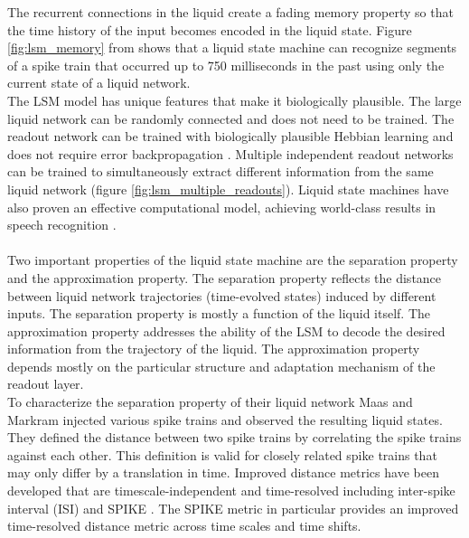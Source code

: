 \documentclass[a4paper,11pt]{article}
\begin{document}
The recurrent connections in the liquid create a fading memory property so that the time history of the input becomes encoded in the liquid state.
Figure \ref{fig:lsm_memory} from \cite{maas2002} shows that a liquid state machine can recognize segments of a spike train that occurred up to 750 milliseconds in the past using only the current state of a liquid network.
\\
The LSM model has unique features that make it biologically plausible. 
The large liquid network can be randomly connected and does not need to be trained.
The readout network can be trained with biologically plausible Hebbian learning and does not require error backpropagation \cite{auer2002}.
Multiple independent readout networks can be trained to simultaneously extract different information from the same liquid network (figure \ref{fig:lsm_multiple_readouts}).
Liquid state machines have also proven an effective computational model, achieving world-class results in speech recognition \cite{zhang2015}.
\\ \\
Two important properties of the liquid state machine are the separation property and the approximation property.
The separation property reflects the distance between liquid network trajectories (time-evolved states) induced by different inputs.
The separation property is mostly a function of the liquid itself.
The approximation property addresses the ability of the LSM to decode the desired information from the trajectory of the liquid.
The approximation property depends mostly on the particular structure and adaptation mechanism of the readout layer.
\\ 
To characterize the separation property of their liquid network Maas and Markram injected various spike trains and observed the resulting liquid states.
They defined the distance between two spike trains by correlating the spike trains against each other.
This definition is valid for closely related spike trains that may only differ by a translation in time.  
Improved distance metrics have been developed that are timescale-independent and time-resolved including inter-spike interval (ISI) and SPIKE \cite{kreuz2012}.
The SPIKE metric in particular provides an improved time-resolved distance metric across time scales and time shifts.
\end{document}
